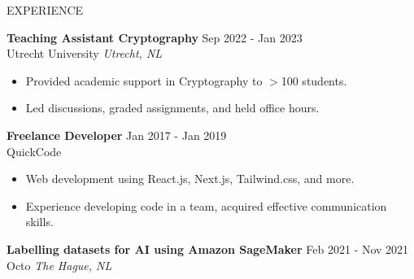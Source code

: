 \documentclass{resume} %
\begin{document}
\begin{rSection}{EXPERIENCE}


\textbf{Teaching Assistant Cryptography} \hfill Sep 2022 - Jan 2023\\
Utrecht University \hfill \textit{Utrecht, NL}
 \begin{itemize}
    \itemsep -3pt {} 
    \item Provided academic support in Cryptography to $>$100 students.
    \item Led discussions, graded assignments, and held office hours.
 \end{itemize}
 
\textbf{Freelance Developer} \hfill Jan 2017 - Jan 2019\\
QuickCode %
 \begin{itemize}
    \itemsep -3pt {} 
     \item Web development using React.js, Next.js, Tailwind.css, and more.
     \item Experience developing code in a team, acquired effective communication skills.
 \end{itemize}

\textbf{Labelling datasets for AI using Amazon SageMaker} \hfill Feb 2021 - Nov 2021\\
Octo \hfill \textit{The Hague, NL}

\end{rSection} 

\end{document}
